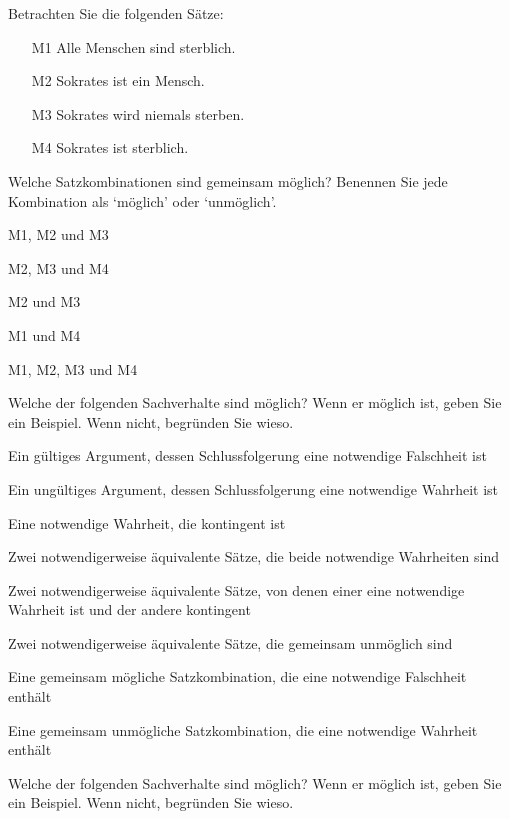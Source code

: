 \problempart Betrachten Sie die folgenden Sätze:
\begin{enumerate}%
\item[M1] \label{itm:allmortal} Alle Menschen sind sterblich.
\item[M2] \label{itm:socperson} Sokrates ist ein Mensch.
\item[M3] \label{itm:socnotdie} Sokrates wird niemals sterben.
\item[M4] \label{itm:socmortal} Sokrates ist sterblich.
\end{enumerate}
Welche Satzkombinationen sind gemeinsam möglich? Benennen Sie jede Kombination als `möglich' oder `unmöglich'.
\begin{earg}
\item M1, M2 und M3
\item M2, M3 und M4
\item M2 und M3
\item M1 und M4
\item M1, M2, M3 und M4
\end{earg}

\problempart
\label{pr.EnglishCombinations2}
Welche der folgenden Sachverhalte sind möglich? Wenn er möglich ist, geben Sie ein Beispiel. Wenn nicht, begründen Sie wieso.
\begin{earg}
\item Ein gültiges Argument, dessen Schlussfolgerung eine notwendige Falschheit ist
\item Ein ungültiges Argument, dessen Schlussfolgerung eine notwendige Wahrheit ist
\item Eine notwendige Wahrheit, die kontingent ist
\item Zwei notwendigerweise äquivalente Sätze, die beide notwendige Wahrheiten sind
\item Zwei notwendigerweise äquivalente Sätze, von denen einer eine notwendige Wahrheit ist und der andere kontingent
\item Zwei notwendigerweise äquivalente Sätze, die gemeinsam unmöglich sind
\item Eine gemeinsam mögliche Satzkombination, die eine notwendige Falschheit enthält
\item Eine gemeinsam unmögliche Satzkombination, die eine notwendige Wahrheit enthält
\end{earg}

\problempart
Welche der folgenden Sachverhalte sind möglich? Wenn er möglich ist, geben Sie ein Beispiel. Wenn nicht, begründen Sie wieso.

